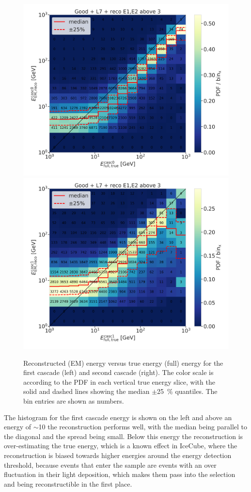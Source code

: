 \begin{figure}[h]
	\centering
    \includegraphics[width=0.49\linewidth]{figures/results/190607/resolutions/190607_millipede_level_no_NaNs_NEW_flipped_casc0_reco_energy_vs_casc0_true_energy_reco_above3_step_contours.png}
    \includegraphics[width=0.49\linewidth]{figures/results/190607/resolutions/190607_millipede_level_no_NaNs_NEW_flipped_casc1_reco_energy_vs_casc1_true_energy_reco_above3_step_contours.png}
    \caption[Preliminary 2-d reconstructed versus true cascade energy resolutions]{Reconstructed (EM) energy versus true energy (full) energy for the first cascade (left) and second cascade (right). The color scale is according to the PDF in each vertical true energy slice, with the solid and dashed lines showing the median $\pm$\SI{25}{\percent} quantiles. The bin entries are shown as numbers.}
\end{figure}

The histogram for the first cascade energy is shown on the left and above an energy of $\sim$\SI{10}{\gev} the reconstruction performs well, with the median being parallel to the diagonal and the spread being small. Below this energy the reconstruction is over-estimating the true energy, which is a known effect in IceCube, where the reconstruction is biased towards higher energies around the energy detection threshold, because events that enter the sample are events with an over fluctuation in their light deposition, which makes them pass into the selection and being reconstructible in the first place.

